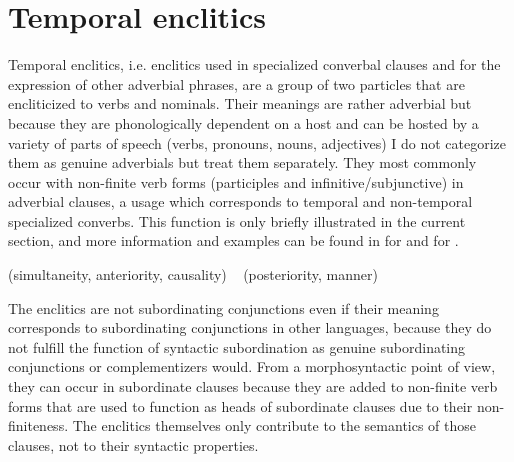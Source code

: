 \section{Temporal enclitics}
\label{sec:Temporal enclitics}

Temporal enclitics, i.e. enclitics used in specialized converbal clauses and for the expression of other adverbial phrases, are a group of two particles that are encliticized to verbs and nominals. Their meanings are rather adverbial  but because they are phonologically dependent on a host and can be hosted by a variety of parts of speech (verbs, pronouns, nouns, adjectives) I do not categorize them as genuine adverbials but treat them separately. They most commonly occur with non-finite verb forms (participles and infinitive/subjunctive) in adverbial clauses, a usage which corresponds to temporal and non-temporal specialized converbs. This function is only briefly illustrated in the current section, and more information and examples can be found in  for  and  for . 


\begin{exe}
	\ex	\label{ex:subordinating enclitics}
	\begin{xlist}
		\TabPositions{14em}
		\ex	{} 	\tab	(simultaneity, anteriority, causality)	   
		\ex	{} 
		\sn	~\hspace*{1em}					\tab	(posteriority, manner)	      
	\end{xlist}
\end{exe}

The enclitics are not subordinating conjunctions even if their meaning corresponds to subordinating conjunctions in other languages, because they do not fulfill the function of syntactic subordination as genuine subordinating conjunctions or complementizers would. From a morphosyntactic point of view, they can occur in subordinate clauses because they are added to non-finite verb forms that are used to function as heads of subordinate clauses due to their non-finiteness. The enclitics themselves only contribute to the semantics of those clauses, not to their syntactic properties. 

